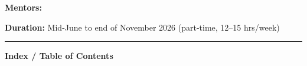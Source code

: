 {{{            \begin{center}
                {\color{white}\textbf{Mentors:}} \mentors
            \end{center}
            
            \begin{center}
                {\color{white}\textbf{Duration:}} Mid-June to end of November 2026 (part-time, 12--15 hrs/week)
            \end{center}
            
            \vspace{0.3cm}
            
            \begin{center}
                \textcolor{white}{\rule{0.8\textwidth}{0.3pt}}
            \end{center}
            
            \vspace{0.3cm}
            
            \begin{center}
                {\color{white}\textbf{\myname}}
            \end{center}
            
            \begin{center}
                {\color{white}\mydegree}
            \end{center}
            
            \begin{center}
                {\color{white}\href{\githuburl}{\color{white}\mygithub}}
            \end{center}
            
            \begin{center}
                {\color{white}\mylocation}
            \end{center}
            
            \begin{center}
                {\color{white}\texttt{\myemail}}
            \end{center}
            
            \vspace{0.8cm}
        }%
    }%
}

\vspace{0.5cm}

\begin{center}
    {\Large\bfseries\color{primary} Index / Table of Contents}
\end{center}

